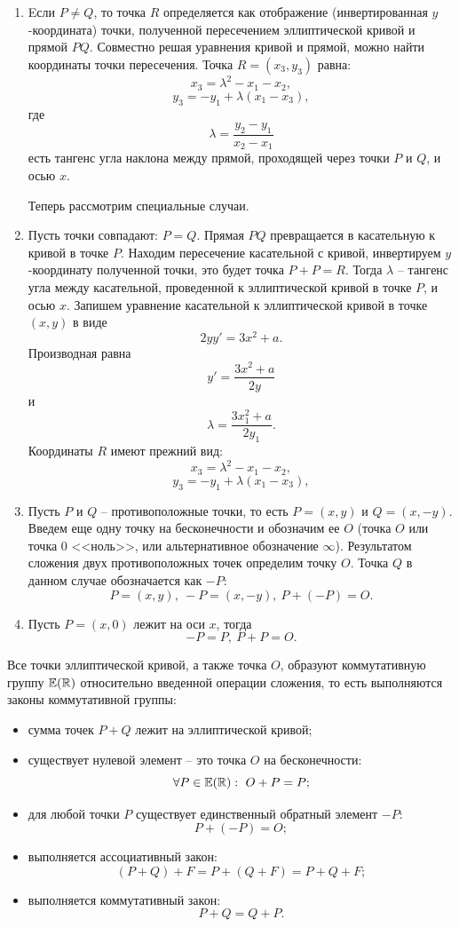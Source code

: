 \begin{enumerate}
    \item Eсли $P \neq Q$, то точка $R$ определяется как отображение (инвертированная $y$-координата) точки, полученной пересечением эллиптической кривой и прямой $PQ$. Совместно решая уравнения кривой и прямой, можно найти координаты точки пересечения. Точка $R = (x_3, y_3)$ равна:
        \[ x_3 = \lambda^2 - x_1 - x_2, \]
        \[ y_3 = - y_1 + \lambda (x_1 - x_3), \]
        где
        \[ \lambda = \frac{y_2 - y_1}{x_2 - x_1} \]
        есть тангенс угла наклона между прямой, проходящей через точки $P$ и $Q$, и осью $x$.

        Теперь рассмотрим специальные случаи.
    \item Пусть точки совпадают: $P = Q$. Прямая $PQ$ превращается в касательную к кривой в точке $P$. Находим пересечение касательной с кривой, инвертируем $y$-координату полученной точки, это будет точка $P + P = R$. Тогда $\lambda$ -- тангенс угла между касательной, проведенной к эллиптической кривой в точке $P$, и осью $x$. Запишем уравнение касательной к эллиптической кривой в точке $(x,y)$ в виде
            \[ 2 y y' = 3 x^2 + a. \]
        Производная равна
            \[ y' = \frac{3 x^2 + a}{2 y} \]
        и
            \[ \lambda = \frac{3 x_1^2 + a}{2 y_1}. \]
        Координаты $R$ имеют прежний вид:
            \[ x_3 = \lambda^2 - x_1 - x_2, \]
            \[ y_3 = - y_1 + \lambda (x_1 - x_3), \]
    \item Пусть $P$ и $Q$ -- противоположные точки, то есть $P=(x,y)$ и $Q=(x, -y)$. Введем еще одну точку на бесконечности и обозначим ее $O$ (точка $O$ или точка 0 <<ноль>>, или альтернативное обозначение $\infty$). Результатом сложения двух противоположных точек определим точку $O$. Точка $Q$ в данном случае обозначается как $-P$:
        \[ P = (x,y), ~ -P = (x, -y), ~ P + (-P) = O. \]
    \item Пусть $P = (x, 0)$ лежит на оси $x$, тогда
        \[ -P = P, ~ P + P = O. \]
\end{enumerate}

Все точки эллиптической кривой, а также точка $O$, образуют коммутативную группу $\mathbb{E}(\mathbb{R})$ относительно введенной операции сложения, то есть выполняются законы коммутативной группы:
\begin{itemize}
    \item сумма точек $P + Q$ лежит на эллиптической кривой;
    \item существует нулевой элемент -- это точка $O$ на бесконечности:
        \[ \forall P \in \mathbb{E}(\mathbb{R}): ~ O + P = P; \]
    \item для любой точки $P$ существует единственный обратный элемент $-P$:
        \[ P + (-P) = O; \]
    \item выполняется ассоциативный закон:
        \[ (P + Q) + F = P + (Q + F) = P + Q + F; \]
    \item выполняется коммутативный закон:
        \[ P + Q = Q + P. \]
\end{itemize}

